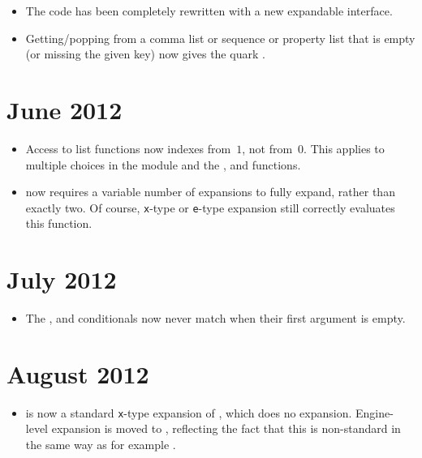 \documentclass{l3doc}
\begin{document}
\begin{itemize}
  \item The  code has been completely rewritten with a new
    expandable interface.
  \item Getting/popping from a comma list or sequence or property list
    that is empty (or missing the given key) now gives the quark
    .
\end{itemize}

\section{June 2012}

\begin{itemize}
  \item Access to list functions now indexes from~$1$, not from~$0$.
  This applies to multiple choices in the  module and
  the ,  and 
  functions.
  \item {} now requires a variable number of
  expansions to fully expand, rather than exactly two.  Of course,
  \texttt{x}-type or \texttt{e}-type expansion still correctly evaluates this function.
\end{itemize}

\section{July 2012}

\begin{itemize}
  \item The , 
    and  conditionals now never match when
    their first argument is empty.
\end{itemize}

\section{August 2012}

\begin{itemize}
  \item {} is now a standard \texttt{x}-type expansion of
    , which does no expansion. Engine-level expansion is moved
    to , reflecting the fact that this is non-standard in the
    same way as for example .
\end{itemize}
\end{document}
